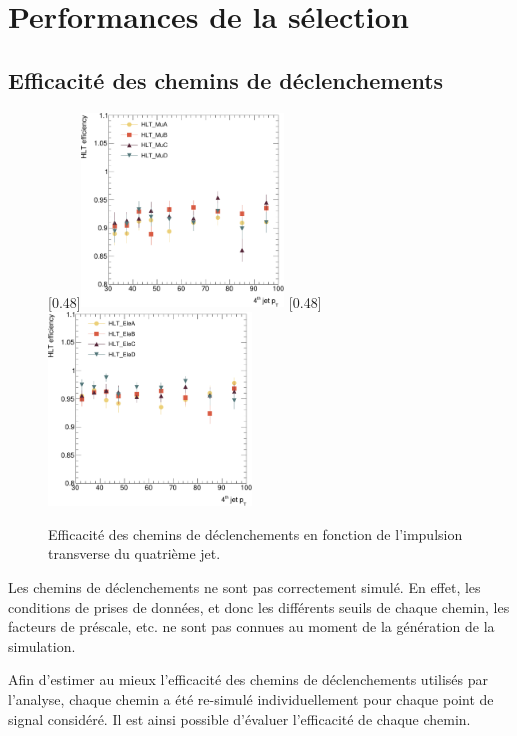 \section{Performances de la sélection}

\subsection{Efficacité des chemins de déclenchements}

\begin{figure}[tbp] \centering
    [0.48\textwidth]{\includegraphics[width=0.48\textwidth]{chapitre7/figs/HLT/HLTturnon_mu_fourthJet_zoom.pdf}}
    [0.48\textwidth]{\includegraphics[width=0.48\textwidth]{chapitre7/figs/HLT/HLTturnon_el_fourthJet_zoom.pdf}}
    \caption{Efficacité des chemins de déclenchements en fonction de l'impulsion transverse du quatrième jet.}
    \label{fig:trig_eff}
\end{figure}

Les chemins de déclenchements ne sont pas correctement simulé. En effet, les conditions de prises de données, et donc les différents seuils de chaque chemin, les facteurs de préscale, etc. ne sont pas connues au moment de la génération de la simulation.

Afin d'estimer au mieux l'efficacité des chemins de déclenchements utilisés par l'analyse, chaque chemin a été re-simulé individuellement pour chaque point de signal considéré. Il est ainsi possible d'évaluer l'efficacité de chaque chemin.

